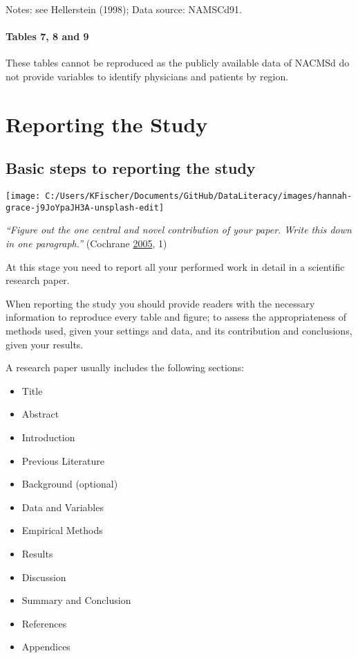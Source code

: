 \documentclass[
]{book}
\providecommand{\tightlist}{%
  \setlength{\itemsep}{0pt}\setlength{\parskip}{0pt}}
\begin{document}
Notes: see Hellerstein (1998); Data source: NAMSCd91.

\hypertarget{tables-7-8-and-9}{%
\subsubsection{Tables 7, 8 and 9}\label{tables-7-8-and-9}}

These tables cannot be reproduced as the publicly available data of
NACMSd do not provide variables to identify physicians and patients by
region.

\hypertarget{report-study}{%
\chapter{Reporting the Study}\label{report-study}}

\hypertarget{basic-steps-to-reporting-the-study}{%
\section{Basic steps to reporting the
study}\label{basic-steps-to-reporting-the-study}}

\begin{center}\texttt{[image: C:/Users/KFischer/Documents/GitHub/DataLiteracy/images/hannah-grace-j9JoYpaJH3A-unsplash-edit]} \end{center}

\emph{``Figure out the one central and novel contribution of your paper.
Write this down in one paragraph.''} (Cochrane
\protect\hyperlink{ref-cochrane_writing_2005}{2005}, 1)

At this stage you need to report all your performed work in detail in a
scientific research paper.

When reporting the study you should provide readers with the necessary
information to reproduce every table and figure; to assess the
appropriateness of methods used, given your settings and data, and its
contribution and conclusions, given your results.

A research paper usually includes the following sections:

\begin{itemize}
\tightlist
\item
  Title
\item
  Abstract
\item
  Introduction
\item
  Previous Literature
\item
  Background (optional)
\item
  Data and Variables
\item
  Empirical Methods
\item
  Results
\item
  Discussion
\item
  Summary and Conclusion
\item
  References
\item
  Appendices
\end{itemize}
\end{document}

